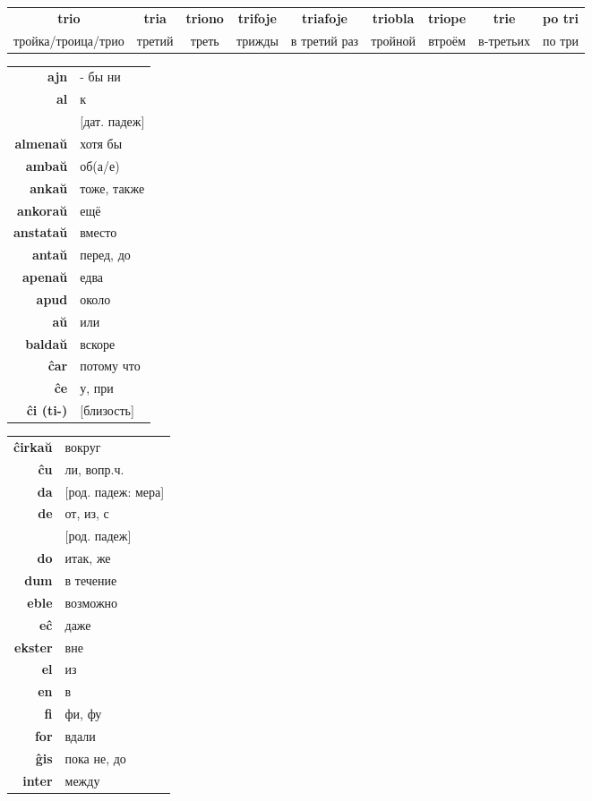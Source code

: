 \documentclass{article}
\def\b#1{\textbf{#1}}
\begin{document}
\begin{tabular}{ccccccccc}
\b{trio} & \b{tria} & \b{triono} & \b{trifoje} & \b{triafoje} & \b{triobla} & \b{triope} & \b{trie} & \b{po tri} \\
тройка/троица/трио & третий & треть & трижды & в третий раз & тройной & втроём  & в-третьих & по три \\ 
\end{tabular}

\begin{tabular}{>{\bfseries}rl}
ajn & - бы ни \\
al & к \\
~ & {}[дат. падеж] \\
almenaŭ & хотя бы \\
ambaŭ & об(а/е) \\
ankaŭ & тоже, также \\
ankoraŭ & ещё \\
anstataŭ & вместо \\
antaŭ & перед, до \\
apenaŭ & едва \\
apud & около \\
aŭ & или \\
baldaŭ & вскоре \\
ĉar & потому что \\
ĉe & у, при \\
ĉi (ti-) & {}[близость] \\
\end{tabular}
\begin{tabular}{>{\bfseries}rl}
ĉirkaŭ & вокруг \\
ĉu & ли, вопр.ч. \\
da & {}[род. падеж: мера] \\
de & от, из, с \\
~ & {}[род. падеж] \\
do & итак, же \\
dum & в течение \\
eble & возможно \\
eĉ & даже \\
ekster & вне \\
el & из \\
en & в \\
fi & фи, фу \\
for & вдали \\
ĝis & пока не, до \\
inter & между \\
\end{tabular}
\end{document}
